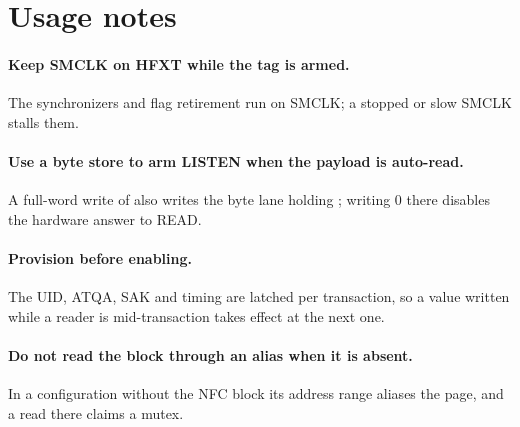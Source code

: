\section{Usage notes}

\paragraph{Keep SMCLK on HFXT while the tag is armed.} The synchronizers and flag retirement run on SMCLK; a stopped or slow SMCLK stalls them.

\paragraph{Use a byte store to arm LISTEN when the payload is auto-read.} A full-word write of  also writes the byte lane holding ; writing 0 there disables the hardware answer to READ.

\paragraph{Provision before enabling.} The UID, ATQA, SAK and timing are latched per transaction, so a value written while a reader is mid-transaction takes effect at the next one.

\paragraph{Do not read the block through an alias when it is absent.} In a configuration without the NFC block its address range aliases the  page, and a read there claims a mutex.
